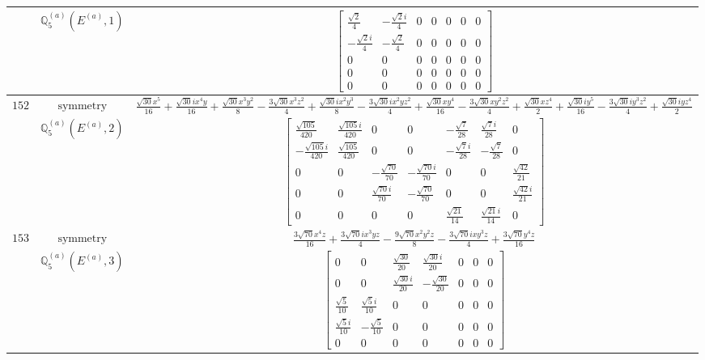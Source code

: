 \documentclass[fleqn,8pt,landscape]{jsarticle}
\begin{document}
\begin{longtable}{ccc}
$  $ & $ \mathbb{Q}_{5}^{(a)}(E^{(a)},1) $ & $ \begin{bmatrix} \frac{\sqrt{2}}{4} & - \frac{\sqrt{2} i}{4} & 0 & 0 & 0 & 0 & 0 \\ - \frac{\sqrt{2} i}{4} & - \frac{\sqrt{2}}{4} & 0 & 0 & 0 & 0 & 0 \\ 0 & 0 & 0 & 0 & 0 & 0 & 0 \\ 0 & 0 & 0 & 0 & 0 & 0 & 0 \\ 0 & 0 & 0 & 0 & 0 & 0 & 0 \end{bmatrix} $ \\ \hline
$ 152 $ & $ \text{symmetry} $ & $ \frac{\sqrt{30} x^{5}}{16} + \frac{\sqrt{30} i x^{4} y}{16} + \frac{\sqrt{30} x^{3} y^{2}}{8} - \frac{3 \sqrt{30} x^{3} z^{2}}{4} + \frac{\sqrt{30} i x^{2} y^{3}}{8} - \frac{3 \sqrt{30} i x^{2} y z^{2}}{4} + \frac{\sqrt{30} x y^{4}}{16} - \frac{3 \sqrt{30} x y^{2} z^{2}}{4} + \frac{\sqrt{30} x z^{4}}{2} + \frac{\sqrt{30} i y^{5}}{16} - \frac{3 \sqrt{30} i y^{3} z^{2}}{4} + \frac{\sqrt{30} i y z^{4}}{2} $ \\
$  $ & $ \mathbb{Q}_{5}^{(a)}(E^{(a)},2) $ & $ \begin{bmatrix} \frac{\sqrt{105}}{420} & \frac{\sqrt{105} i}{420} & 0 & 0 & - \frac{\sqrt{7}}{28} & \frac{\sqrt{7} i}{28} & 0 \\ - \frac{\sqrt{105} i}{420} & \frac{\sqrt{105}}{420} & 0 & 0 & - \frac{\sqrt{7} i}{28} & - \frac{\sqrt{7}}{28} & 0 \\ 0 & 0 & - \frac{\sqrt{70}}{70} & - \frac{\sqrt{70} i}{70} & 0 & 0 & \frac{\sqrt{42}}{21} \\ 0 & 0 & \frac{\sqrt{70} i}{70} & - \frac{\sqrt{70}}{70} & 0 & 0 & \frac{\sqrt{42} i}{21} \\ 0 & 0 & 0 & 0 & \frac{\sqrt{21}}{14} & \frac{\sqrt{21} i}{14} & 0 \end{bmatrix} $ \\ \hline
$ 153 $ & $ \text{symmetry} $ & $ \frac{3 \sqrt{70} x^{4} z}{16} + \frac{3 \sqrt{70} i x^{3} y z}{4} - \frac{9 \sqrt{70} x^{2} y^{2} z}{8} - \frac{3 \sqrt{70} i x y^{3} z}{4} + \frac{3 \sqrt{70} y^{4} z}{16} $ \\
$  $ & $ \mathbb{Q}_{5}^{(a)}(E^{(a)},3) $ & $ \begin{bmatrix} 0 & 0 & \frac{\sqrt{30}}{20} & \frac{\sqrt{30} i}{20} & 0 & 0 & 0 \\ 0 & 0 & \frac{\sqrt{30} i}{20} & - \frac{\sqrt{30}}{20} & 0 & 0 & 0 \\ \frac{\sqrt{5}}{10} & \frac{\sqrt{5} i}{10} & 0 & 0 & 0 & 0 & 0 \\ \frac{\sqrt{5} i}{10} & - \frac{\sqrt{5}}{10} & 0 & 0 & 0 & 0 & 0 \\ 0 & 0 & 0 & 0 & 0 & 0 & 0 \end{bmatrix} $ \\ \hline

\end{longtable}
\end{document}
